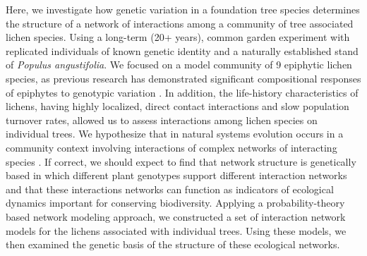 \documentclass[9pt,twocolumn,twoside,lineno]{pnas-new}
\begin{document}
Here, we investigate how genetic variation in a foundation tree
species determines the structure of a network of interactions among a
community of tree associated lichen species. Using a long-term (20+
years), common garden experiment with replicated individuals of known
genetic identity and a naturally established stand of \textit{Populus
  angustifolia}. We focused on a model community of 9 epiphytic lichen
species, as previous research has demonstrated significant
compositional responses of epiphytes to genotypic variation
\cite{Winfree2011, Zytynska2011}. In addition, the life-history
characteristics of lichens, having highly localized, direct contact
interactions and slow population turnover rates, allowed us to assess
interactions among lichen species on individual trees. We hypothesize
that in natural systems evolution occurs in a community context
involving interactions of complex networks of interacting species
\cite{Lau2015a, Keith2017, Thompson2013, Bascompte2006}.  If correct,
we should expect to find that network structure is genetically based
in which different plant genotypes support different interaction
networks and that these interactions networks can function as
indicators of ecological dynamics important for conserving
biodiversity.  Applying a probability-theory based network modeling
approach, we constructed a set of interaction network models for the
lichens associated with individual trees. Using these models, we then
examined the genetic basis of the structure of these ecological
networks.
\end{document}
